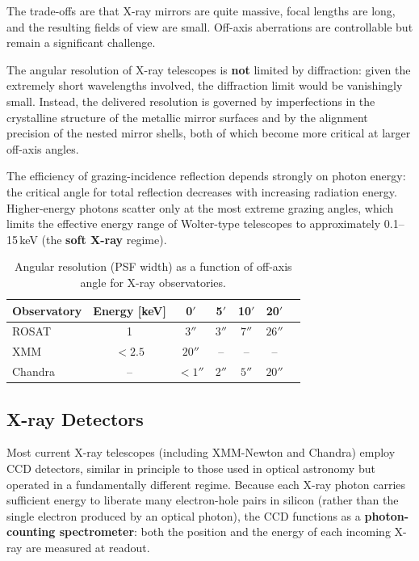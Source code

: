 The trade-offs are that X-ray mirrors are quite massive, focal lengths are long, and the resulting fields of view are small. Off-axis aberrations are controllable but remain a significant challenge.

\begin{observationblock}
The angular resolution of X-ray telescopes is \textbf{not} limited by diffraction: given the extremely short wavelengths involved, the diffraction limit would be vanishingly small. Instead, the delivered resolution is governed by imperfections in the crystalline structure of the metallic mirror surfaces and by the alignment precision of the nested mirror shells, both of which become more critical at larger off-axis angles.
\end{observationblock}

The efficiency of grazing-incidence reflection depends strongly on photon energy: the critical angle for total reflection decreases with increasing radiation energy. Higher-energy photons scatter only at the most extreme grazing angles, which limits the effective energy range of Wolter-type telescopes to approximately 0.1--15\,keV (the \textbf{soft X-ray} regime).

\begin{table}[ht]
    \centering
    \caption{Angular resolution (PSF width) as a function of off-axis angle for X-ray observatories.}
    \renewcommand{\arraystretch}{1.15}
    \begin{tabular}{lcccccc}
        \textbf{Observatory} & \textbf{Energy [keV]} & \textbf{0$'$} & \textbf{5$'$} & \textbf{10$'$} & \textbf{20$'$} \\
        \midrule
        ROSAT    & 1     & $3''$   & $3''$   & $7''$   & $26''$ \\
        XMM      & $<2.5$ & $20''$  & --      & --      & --     \\
        Chandra  & --    & $<1''$  & $2''$   & $5''$   & $20''$ \\
    \end{tabular}
\end{table}

\vspace{-1em}

\subsection{X-ray Detectors} \label{subsec:xray_detectors}

Most current X-ray telescopes (including XMM-Newton and Chandra) employ CCD detectors, similar in principle to those used in optical astronomy but operated in a fundamentally different regime. Because each X-ray photon carries sufficient energy to liberate many electron-hole pairs in silicon (rather than the single electron produced by an optical photon), the CCD functions as a \textbf{photon-counting spectrometer}: both the position and the energy of each incoming X-ray are measured at readout.

